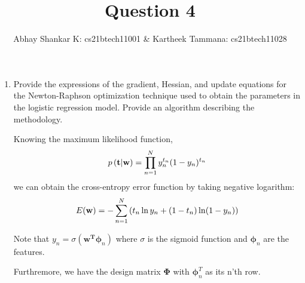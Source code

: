 \documentclass[reqno]{amsart}
\begin{document}
    \title{Question 4}
    \author{Abhay Shankar K: cs21btech11001 \& Kartheek Tammana: cs21btech11028}
    \maketitle

    \begin{enumerate}[label=\textbf{(\Roman*)}]
        \item \question Provide the expressions of the gradient, Hessian, and update equations for the Newton-Raphson optimization technique used to obtain the parameters in the logistic regression model. Provide an algorithm describing the methodology.
        
        \solution
        Knowing the maximum likelihood function, 
        \[p\left({\mathbf{t}} \middle| {\mathbf{w}}\right) = \prod_{n = 1}^{N} y_n^{t_n} (1 - y_n)^{t_n}\]
        we can obtain the cross-entropy error function by taking negative logarithm: 
        \begin{equation}
            E(\mathbf{w}) = - \sum_{n = 1}^{N} \left(t_n \ln y_n + (1 - t_n) \ln (1 - y_n)\right) \label{eq:cross-entropy}
        \end{equation}
        
        Note that \(y_n = \sigma(\mathbf{w^T}\boldsymbol{\phi}_n)\) where \(\sigma\) is the sigmoid function and \(\boldsymbol{\phi}_n\) are the features. 

        Furthremore, we have the design matrix \(\mathbf{\Phi}\) with \(\boldsymbol{\phi}_n^T\) as its n'th row.


\end{enumerate}
\end{document}
